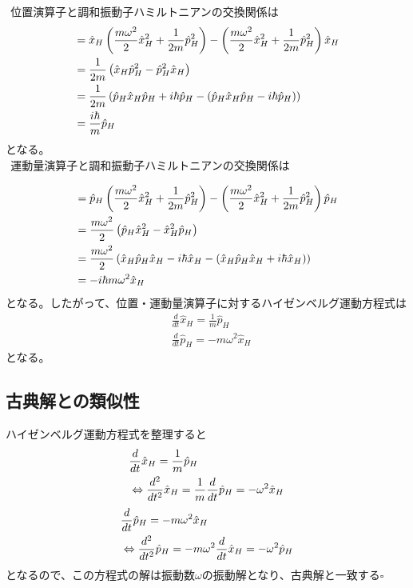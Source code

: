 \documentclass{jsarticle}  %
\numberwithin{equation}{section} %
\numberwithin{figure}{section}
\begin{document}
    $\ \ $位置演算子と調和振動子ハミルトニアンの交換関係は
    \begin{align}
        [\hat{x}_H,\hat{H}] &= \hat{x}_H \left( \frac{m\omega^2}{2}\hat{x}_H^2 + \frac{1}{2m} \hat{p}_H^2 \right) - \left( \frac{m\omega^2}{2}\hat{x}_H^2 + \frac{1}{2m} \hat{p}_H^2 \right) \hat{x}_H \notag \\
        &= \frac{1}{2m}\left( \hat{x}_H \hat{p}_H^2 - \hat{p}_H^2\hat{x}_H \right) \notag \\
        &= \frac{1}{2m} \left( \hat{p}_H\hat{x}_H \hat{p}_H + i\hbar\hat{p}_H- \left( \hat{p}_H\hat{x}_H \hat{p}_H - i\hbar\hat{p}_H \right) \right) \notag \\
        &= \frac{i\hbar }{m} \hat{p}_H
    \end{align}
    となる。\\
    $\ \ $運動量演算子と調和振動子ハミルトニアンの交換関係は
    
    \begin{align}
        [\hat{p}_H,\hat{H}] &= \hat{p}_H \left( \frac{m\omega^2}{2}\hat{x}_H^2 + \frac{1}{2m} \hat{p}_H^2 \right) - \left( \frac{m\omega^2}{2}\hat{x}_H^2 + \frac{1}{2m} \hat{p}_H^2 \right) \hat{p}_H \notag \\
        &= \frac{m\omega^2}{2}\left( \hat{p}_H \hat{x}_H^2 - \hat{x}_H^2\hat{p}_H \right) \notag \\
        &= \frac{m\omega^2}{2} \left( \hat{x}_H\hat{p}_H \hat{x}_H - i\hbar\hat{x}_H- \left( \hat{x}_H\hat{p}_H \hat{x}_H + i\hbar\hat{x}_H \right) \right) \notag \\
        &= -i\hbar m\omega^2 \hat{x}_H
    \end{align}
    となる。したがって、位置・運動量演算子に対するハイゼンベルグ運動方程式は
    \begin{align}
        &\frac{d}{dt} \hat{x}_H = \frac{1}{m} \hat{p}_H \\
        &\frac{d}{dt} \hat{p}_H = -m\omega^2 \hat{x}_H
    \end{align}
    となる。
\subsection{古典解との類似性}
    ハイゼンベルグ運動方程式を整理すると
    \begin{align}
        &\frac{d}{dt} \hat{x}_H = \frac{1}{m} \hat{p}_H \notag \\
        &\Leftrightarrow \frac{d^2}{dt^2} \hat{x}_H = \frac{1}{m} \frac{d}{dt}\hat{p}_H = -\omega^2 \hat{x}_H
    \end{align}
    \begin{align}
        &\frac{d}{dt} \hat{p}_H = -m\omega^2 \hat{x}_H \notag \\
        &\Leftrightarrow \frac{d^2}{dt^2} \hat{p}_H = -m\omega^2 \frac{d}{dt} \hat{x}_H = -\omega^2 \hat{p}_H
    \end{align}
    となるので、この方程式の解は振動数$\omega$の振動解となり、古典解と一致する$\square$
\end{document}
